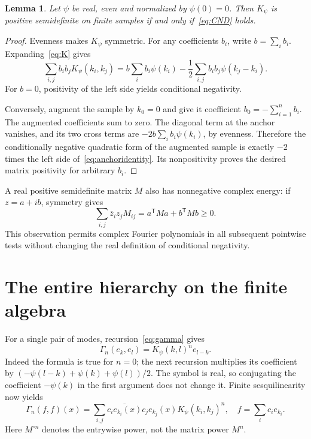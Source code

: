 \documentclass[11pt]{article}
\newtheorem{lemma}[theorem]{Lemma}
\theoremstyle{remark}\newtheorem{remark}[theorem]{Remark}
\begin{document}
\begin{lemma}\label{lem:anchor}
Let $\psi$ be real, even and normalized by $\psi(0)=0$.
Then $K_\psi$ is positive semidefinite on finite samples if and
only if~\eqref{eq:CND} holds.
\end{lemma}
\begin{proof}
Evenness makes $K_\psi$ symmetric. For any coefficients $b_i$,
write $b=\sum_i b_i$. Expanding~\eqref{eq:K} gives
\begin{equation}\label{eq:anchoridentity}
 \sum_{i,j}b_i b_j K_\psi(k_i,k_j)
 =b\sum_i b_i\psi(k_i)
       -\frac12\sum_{i,j}b_i b_j\psi(k_j-k_i).
\end{equation}
For $b=0$, positivity of the left side yields conditional
negativity.

Conversely, augment the sample by $k_0=0$ and give it coefficient
$b_0=-\sum_{i=1}^n b_i$. The augmented coefficients sum to zero.
The diagonal term at the anchor vanishes, and its two cross terms
are $-2b\sum_i b_i\psi(k_i)$, by evenness. Therefore the
conditionally negative quadratic form of the augmented sample
is exactly $-2$ times the left side of~\eqref{eq:anchoridentity}.
Its nonpositivity proves the desired matrix positivity for
arbitrary $b_i$.
\end{proof}

A real positive semidefinite matrix $M$ also has nonnegative
complex energy: if $z=a+ib$, symmetry gives
\[
 \sum_{i,j}\overline z_i z_j M_{ij}
       =a^{\mathsf T}Ma+b^{\mathsf T}Mb\geq0.
\]
This observation permits complex Fourier polynomials in all
subsequent pointwise tests without changing the real definition
of conditional negativity.

\section{The entire hierarchy on the finite algebra}
For a single pair of modes, recursion~\eqref{eq:gamma} gives
\begin{equation}\label{eq:modegamma}
 \Gamma_n(e_k,e_l)=K_\psi(k,l)^n e_{l-k}.
\end{equation}
Indeed the formula is true for $n=0$; the next recursion multiplies
its coefficient by
$(-\psi(l-k)+\psi(k)+\psi(l))/2$. The symbol is real, so
conjugating the coefficient $-\psi(k)$ in the first argument
does not change it. Finite sesquilinearity now yields
\begin{equation}\label{eq:gammaenergy}
 \Gamma_n(f,f)(x)=\sum_{i,j}
  \overline{c_i e_{k_i}(x)}c_j e_{k_j}(x)
                      K_\psi(k_i,k_j)^n,
 \quad f=\sum_i c_i e_{k_i}.
\end{equation}
Here $M^{\circ n}$ denotes the entrywise power, not the matrix
power $M^n$.
\end{document}

